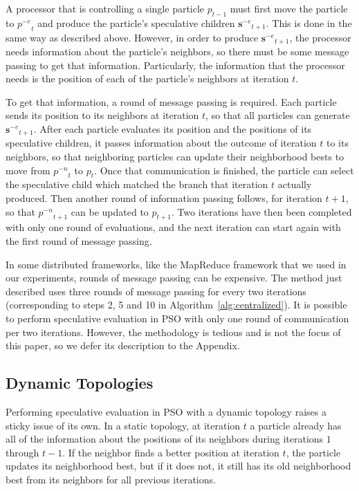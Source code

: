 \documentclass[journal,letterpaper]{IEEEtran}
\newcommand{\alg}[1]{Algorithm~\ref{alg:#1}}
\providecommand{\noeval}[1]{\ensuremath{#1^{-e}}}
\providecommand{\nonbest}[1]{\ensuremath{#1^{-n}}}
\providecommand{\p}{\ensuremath{p}}
\providecommand{\sset}{\ensuremath{\mathbf{s}}}
\begin{document}
A processor that is controlling a single particle $\p_{t-1}$ must first move
the particle to $\noeval{\p}_t$ and produce the particle's speculative children
$\noeval{\sset}_{t+1}$.  This is done in the same way as described above.
However, in order to produce $\noeval{\sset}_{t+1}$, the processor needs
information about the particle's neighbors, so there must be some message
passing to get that information.  Particularly, the information that the
processor needs is the position of each of the particle's neighbors at
iteration $t$.

To get that information, a round of message passing is required.  Each particle
sends its position to its neighbors at iteration $t$, so that all particles can
generate $\noeval{\sset}_{t+1}$.  After each particle evaluates its position
and the positions of its speculative children, it passes information about the
outcome of iteration $t$ to its neighbors, so that neighboring particles can
update their neighborhood bests to move from $\nonbest{\p}_t$ to $\p_t$.  Once
that communication is finished, the particle can select the speculative child
which matched the branch that iteration $t$ actually produced.  Then another
round of information passing follows, for iteration $t+1$, so that
$\nonbest{\p}_{t+1}$ can be updated to $\p_{t+1}$.  Two iterations have then
been completed with only one round of evaluations, and the next iteration can
start again with the first round of message passing.

In some distributed frameworks, like the MapReduce framework that we used in
our experiments, rounds of message passing can be expensive.  The method just
described uses three rounds of message passing for every two iterations
(corresponding to steps 2, 5 and 10 in \alg{centralized}).  It is possible to
perform speculative evaluation in PSO with only one round of communication per
two iterations.  However, the methodology is tedious and is not the focus of
this paper, so we defer its description to the Appendix.

\subsection{Dynamic Topologies}

Performing speculative evaluation in PSO with a dynamic topology raises a
sticky issue of its own.  In a static topology, at iteration $t$ a particle
already has all of the information about the positions of its neighbors during
iterations $1$ through $t-1$.  If the neighbor finds a better position at
iteration $t$, the particle updates its neighborhood best, but if it does not,
it still has its old neighborhood best from its neighbors for all previous
iterations.
\end{document}

